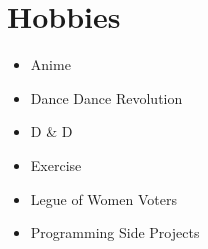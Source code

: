 \documentclass[10pt,a4paper,sans]{moderncv}        %
\begin{document}
\section{Hobbies}

\begin{multicols}{3}
\begin{itemize}

\item Anime
\item Dance Dance Revolution
\item D \& D
\item Exercise
\item Legue of Women Voters
\item Programming Side Projects
\end{itemize}
\end{multicols}



\nocite{*}


\end{document}
